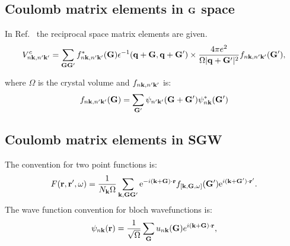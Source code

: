 \documentclass{article}
\def\r{{\bf r}}
\def\k{{\bf k}}
\def\q{{\bf q}}
\def\G{{\bf G}}
\def\w{{\omega}}
\begin{document}
\subsection{Coulomb matrix elements in $\G$ space}
In Ref.~\cite{cohen95} the reciprocal space matrix elements are given.
%
\begin{equation}
\label{eq:cohen1}
V^{c}_{n\k,n'\k'} = \sum_{\G\G'}f^{*}_{n\k,n'\k'}(\G)\epsilon^{-1}(\q+\G,\q+\G')
\times \frac{4\pi e^{2}}{\Omega|\q+\G'|^{2}}f_{n\k,n'\k'}(\G'),
\end{equation}

where $\Omega$ is the crystal volume and $f_{n\k,n'\k'}$ is:
%
\begin{equation}
\label{eq:cohen2}
f_{n\k,n'\k'}(\G) = \sum_{\G'} \psi_{n'\k'}(\G+\G')\psi^{*}_{n\k}(\G')
\end{equation}
%

\subsection{Coulomb matrix elements in SGW}
The convention for two point functions is:
%
\begin{equation}\label{eq.fourier}
 F(\r,\r',\w) = \frac{1}{N_\k\Omega}  \sum_{\k,\G\G'} 
  {\rm e}^{-i(\k+\G)\cdot\r} 
  f_{[\k,\G,\w]}(\G')
  {\rm e}^{i(\k+\G')\cdot\r'}.
\end{equation}
%
The wave function convention for bloch wavefunctions is:
%
\begin{equation}
\psi_{n\k}(\r) = \frac{1}{\sqrt{\Omega}}\sum_{\G}u_{n\k}(\G)e^{i(\k+\G)\cdot\r},
\end{equation}
\end{document}
